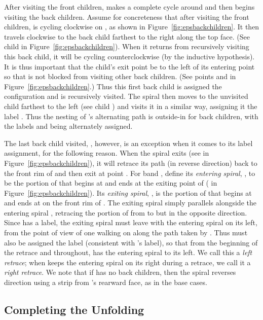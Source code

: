\documentclass[11pt]{article}
\begin{document}
After visiting the front children,  makes a complete cycle around  and
then begins visiting the back children. Assume for concreteness that after visiting the
front children,  is cycling clockwise on , as shown in Figure~\ref{fig:epsbackchildren}. It then travels clockwise to the back child farthest to the right
along the top face. (See child  in Figure~\ref{fig:epsbackchildren}).
When it returns from recursively visiting this back child, it will be cycling counterclockwise
(by the inductive hypothesis).
It is thus important that the child's exit point be to the left
of its entering point so that  is not blocked from visiting other back children.
(See points  and  in Figure~\ref{fig:epsbackchildren}.)
Thus this first back child is assigned the configuration  and is recursively visited.  The spiral then moves to the unvisited child
farthest to the left
(see child ) and visits it in a similar way, assigning it the label .
Thus the nesting of 's alternating path is outside-in for back children,
with the labels  and  being alternately assigned.


The last back child visited, , however, is an exception when it comes to
its label assignment, for the following reason.
When the spiral exits  (see  in Figure~\ref{fig:epsbackchildren}),
it will retrace its path (in reverse direction) back
to the front rim of  and then exit at point .
For band ,  define its \emph{entering spiral}, , to be the portion of  that begins
at  and ends at the exiting point  of 
( in Figure~\ref{fig:epsbackchildren}).
Its \emph{exiting spiral}, , is the portion of  that
begins at 
and ends at  on the front rim of .
The exiting spiral  simply parallels alongside the
entering spiral ,
retracing the portion of  from  to  but in the opposite direction.
Since  has a  label, the exiting spiral must leave  with the entering
spiral on its left, from the point of view of one walking on 
along the path taken by . Thus 
must also be assigned the label  (consistent
with  's label), so that from the beginning of the retrace and throughout,  has
the entering spiral to its left. We call this a \emph{left retrace}; when  keeps
the entering spiral on its right during a retrace, we call it a \emph{right retrace}.
We note that if  has no back children,
then the spiral reverses direction using a strip from 's rearward face, as in
the base cases.

\subsection{Completing the Unfolding}
\label{sec:frontback}
\end{document}
